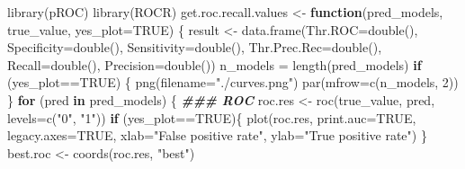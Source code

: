 \documentclass[
]{article}
\newenvironment{Shaded}{\begin{snugshade}}{\end{snugshade}}
\newcommand{\AttributeTok}[1]{\textcolor[rgb]{0.77,0.63,0.00}{#1}}
\newcommand{\ConstantTok}[1]{\textcolor[rgb]{0.00,0.00,0.00}{#1}}
\newcommand{\ControlFlowTok}[1]{\textcolor[rgb]{0.13,0.29,0.53}{\textbf{#1}}}
\newcommand{\DecValTok}[1]{\textcolor[rgb]{0.00,0.00,0.81}{#1}}
\newcommand{\DocumentationTok}[1]{\textcolor[rgb]{0.56,0.35,0.01}{\textbf{\textit{#1}}}}
\newcommand{\FunctionTok}[1]{\textcolor[rgb]{0.00,0.00,0.00}{#1}}
\newcommand{\NormalTok}[1]{#1}
\newcommand{\OtherTok}[1]{\textcolor[rgb]{0.56,0.35,0.01}{#1}}
\newcommand{\SpecialCharTok}[1]{\textcolor[rgb]{0.00,0.00,0.00}{#1}}
\newcommand{\StringTok}[1]{\textcolor[rgb]{0.31,0.60,0.02}{#1}}
\begin{document}
\begin{Shaded}
\begin{Highlighting}[]
\FunctionTok{library}\NormalTok{(pROC)}
\FunctionTok{library}\NormalTok{(ROCR)}
\NormalTok{get.roc.recall.values }\OtherTok{\textless{}{-}} \ControlFlowTok{function}\NormalTok{(pred\_models, true\_value, }\AttributeTok{yes\_plot=}\ConstantTok{TRUE}\NormalTok{) \{}
\NormalTok{  result }\OtherTok{\textless{}{-}} \FunctionTok{data.frame}\NormalTok{(}\AttributeTok{Thr.ROC=}\FunctionTok{double}\NormalTok{(), }\AttributeTok{Specificity=}\FunctionTok{double}\NormalTok{(), }\AttributeTok{Sensitivity=}\FunctionTok{double}\NormalTok{(),}
                       \AttributeTok{Thr.Prec.Rec=}\FunctionTok{double}\NormalTok{(), }\AttributeTok{Recall=}\FunctionTok{double}\NormalTok{(), }\AttributeTok{Precision=}\FunctionTok{double}\NormalTok{())}
\NormalTok{  n\_models }\OtherTok{=} \FunctionTok{length}\NormalTok{(pred\_models)}
  \ControlFlowTok{if}\NormalTok{ (yes\_plot}\SpecialCharTok{==}\ConstantTok{TRUE}\NormalTok{) \{}
    \FunctionTok{png}\NormalTok{(}\AttributeTok{filename=}\StringTok{"./curves.png"}\NormalTok{)}
    \FunctionTok{par}\NormalTok{(}\AttributeTok{mfrow=}\FunctionTok{c}\NormalTok{(n\_models, }\DecValTok{2}\NormalTok{))}
\NormalTok{  \}}
  \ControlFlowTok{for}\NormalTok{ (pred }\ControlFlowTok{in}\NormalTok{ pred\_models) \{}
    \DocumentationTok{\#\#\# ROC}
\NormalTok{    roc.res }\OtherTok{\textless{}{-}} \FunctionTok{roc}\NormalTok{(true\_value, pred, }\AttributeTok{levels=}\FunctionTok{c}\NormalTok{(}\StringTok{"0"}\NormalTok{, }\StringTok{"1"}\NormalTok{))}
    \ControlFlowTok{if}\NormalTok{ (yes\_plot}\SpecialCharTok{==}\ConstantTok{TRUE}\NormalTok{)\{}
      \FunctionTok{plot}\NormalTok{(roc.res, }\AttributeTok{print.auc=}\ConstantTok{TRUE}\NormalTok{, }\AttributeTok{legacy.axes=}\ConstantTok{TRUE}\NormalTok{, }\AttributeTok{xlab=}\StringTok{"False positive rate"}\NormalTok{,}
                \AttributeTok{ylab=}\StringTok{"True positive rate"}\NormalTok{)}
\NormalTok{    \}}
\NormalTok{    best.roc  }\OtherTok{\textless{}{-}} \FunctionTok{coords}\NormalTok{(roc.res, }\StringTok{"best"}\NormalTok{)}
    

\end{Highlighting}
\end{Shaded}
\end{document}
